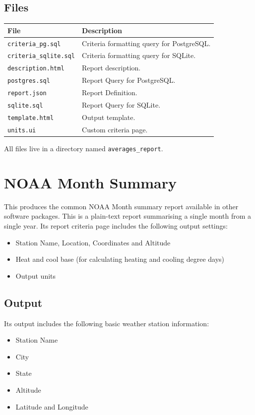\documentclass[a4paper,10pt]{book}
\begin{document}
\subsection{Files}

\begin{tabular}{p{4.5cm} l}
\hline
\textbf{File} & \textbf{Description} \\
\hline
\verb|criteria_pg.sql| & Criteria formatting query for PostgreSQL.\\
\verb|criteria_sqlite.sql| & Criteria formatting query for SQLite.\\
\verb|description.html| & Report description.\\
\verb|postgres.sql| & Report Query for PostgreSQL. \\
\verb|report.json| & Report Definition. \\
\verb|sqlite.sql| & Report Query for SQLite. \\
\verb|template.html| & Output template. \\
\verb|units.ui| & Custom criteria page. \\
\hline
\end{tabular}

All files live in a directory named \verb|averages_report|.

\section{NOAA Month Summary}
This produces the common NOAA Month summary report available in other software packages. This is a plain-text report  summarising a single month from a single year. Its report criteria page includes the following output settings:
\begin{itemize}
\item Station Name, Location, Coordinates and Altitude
\item Heat and cool base (for calculating heating and cooling degree days)
\item Output units
\end{itemize}

\subsection{Output}

 Its output includes the following basic weather station information:
\begin{itemize}
\item Station Name
\item City
\item State
\item Altitude
\item Latitude and Longitude
\end{itemize}
\end{document}

